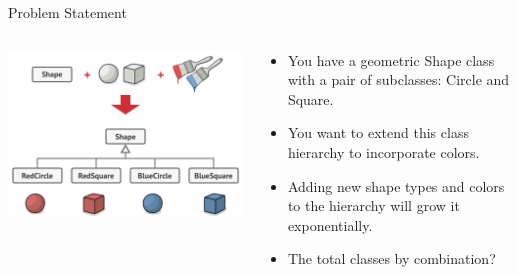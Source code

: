 \documentclass[13pt]{beamer}
\begin{document}
\begin{frame}{Problem Statement}
	\begin{columns}[T]
		\begin{column}{.5\textwidth}
			\includegraphics[scale=0.4]{./images/problem.png}
		\end{column}
	
		\begin{column}{.4\textwidth}
			\begin{itemize}
				\item You have a geometric Shape class with a pair of subclasses: Circle and Square.
				\item You want to extend this class hierarchy to incorporate colors.
				\item Adding new shape types and colors to the hierarchy will grow it exponentially.
				\item The total classes by combination?
			\end{itemize}
		\end{column}
	\end{columns}
\end{frame}
\end{document}

